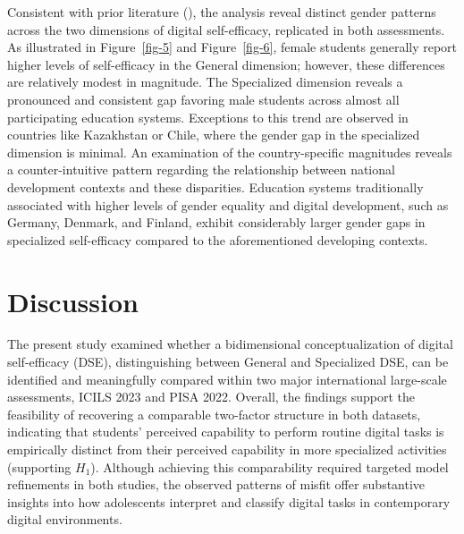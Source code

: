 \documentclass[
  letterpaper,
  DIV=11,
  numbers=noendperiod]{scrartcl}
\begin{document}
Consistent with prior literature
(), the
analysis reveal distinct gender patterns across the two dimensions of
digital self-efficacy, replicated in both assessments. As illustrated in
Figure~\ref{fig-5} and Figure~\ref{fig-6}, female students generally
report higher levels of self-efficacy in the General dimension; however,
these differences are relatively modest in magnitude. The Specialized
dimension reveals a pronounced and consistent gap favoring male students
across almost all participating education systems. Exceptions to this
trend are observed in countries like Kazakhstan or Chile, where the
gender gap in the specialized dimension is minimal. An examination of
the country-specific magnitudes reveals a counter-intuitive pattern
regarding the relationship between national development contexts and
these disparities. Education systems traditionally associated with
higher levels of gender equality and digital development, such as
Germany, Denmark, and Finland, exhibit considerably larger gender gaps
in specialized self-efficacy compared to the aforementioned developing
contexts.

\section{Discussion}\label{discussion}

The present study examined whether a bidimensional conceptualization of
digital self-efficacy (DSE), distinguishing between General and
Specialized DSE, can be identified and meaningfully compared within two
major international large-scale assessments, ICILS 2023 and PISA 2022.
Overall, the findings support the feasibility of recovering a comparable
two-factor structure in both datasets, indicating that students'
perceived capability to perform routine digital tasks is empirically
distinct from their perceived capability in more specialized activities
(supporting \(H_1\)). Although achieving this comparability required
targeted model refinements in both studies, the observed patterns of
misfit offer substantive insights into how adolescents interpret and
classify digital tasks in contemporary digital environments.
\end{document}
